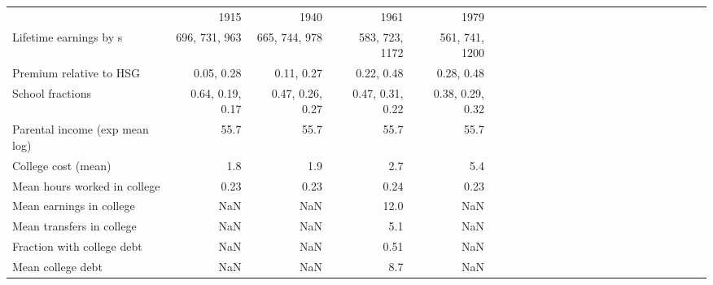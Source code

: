 \begin{tabular}{lrrrrrrrrrrrrrrrrrrrrrrr}
\hline
 & 1915  & 1940  & 1961  & 1979  &   &   &   &   &   &   &   &   &   &   &   &   &   &   &   &   &   &   &   \\
Lifetime earnings by s & 696, 731, 963  & 665, 744, 978  & 583, 723, 1172  & 561, 741, 1200  &   &   &   &   &   &   &   &   &   &   &   &   &   &   &   &   &   &   &   \\
Premium relative to HSG & 0.05, 0.28  & 0.11, 0.27  & 0.22, 0.48  & 0.28, 0.48  &   &   &   &   &   &   &   &   &   &   &   &   &   &   &   &   &   &   &   \\
School fractions & 0.64, 0.19, 0.17  & 0.47, 0.26, 0.27  & 0.47, 0.31, 0.22  & 0.38, 0.29, 0.32  &   &   &   &   &   &   &   &   &   &   &   &   &   &   &   &   &   &   &   \\
Parental income (exp mean log) & 55.7  & 55.7  & 55.7  & 55.7  &   &   &   &   &   &   &   &   &   &   &   &   &   &   &   &   &   &   &   \\
College cost (mean) & 1.8  & 1.9  & 2.7  & 5.4  &   &   &   &   &   &   &   &   &   &   &   &   &   &   &   &   &   &   &   \\
Mean hours worked in college & 0.23  & 0.23  & 0.24  & 0.23  &   &   &   &   &   &   &   &   &   &   &   &   &   &   &   &   &   &   &   \\
Mean earnings in college & NaN  & NaN  & 12.0  & NaN  &   &   &   &   &   &   &   &   &   &   &   &   &   &   &   &   &   &   &   \\
Mean transfers in college & NaN  & NaN  & 5.1  & NaN  &   &   &   &   &   &   &   &   &   &   &   &   &   &   &   &   &   &   &   \\
Fraction with college debt & NaN  & NaN  & 0.51  & NaN  &   &   &   &   &   &   &   &   &   &   &   &   &   &   &   &   &   &   &   \\
Mean college debt & NaN  & NaN  & 8.7  & NaN  &   &   &   &   &   &   &   &   &   &   &   &   &   &   &   &   &   &   &   \\
\hline
\end{tabular}%

